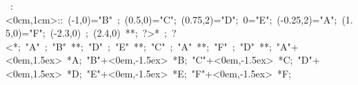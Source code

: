 \hbox{
\xy    <1cm,0cm>:<0cm,1cm>::
       (-1,0)="B" ; (0.5,0)="C";  (0.75,2)="D";   
	   0="E";  (-0.25,2)="A";    (1.5,0)="F";
	   (-2.3,0) ; (2.4,0) **\dir{-};   ?>* \dir{>}; ?<*\dir{<};
       "A" ; "B" **\dir{-}; 
       "D" ; "E" **\dir{-}; 
       "C" ; "A" **\dir{-}; 
       "F" ; "D" **\dir{-}; 
       "A"+<0em,1.5ex> *{A};
	   "B"+<0em,-1.5ex> *{B};
       "C"+<0em,-1.5ex> *{C};
       "D"+<0em,1.5ex> *{D};
       "E"+<0em,-1.5ex> *{E};
       "F"+<0em,-1.5ex> *{F};
       \endxy}
